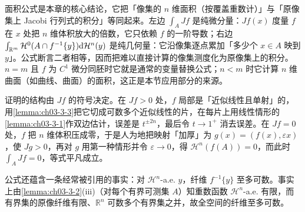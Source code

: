 \documentclass[../../main.tex]{subfiles}%
\begin{document}
\begin{remark}\label{remark:ch03-thm-3-8-动机}
面积公式是本章的核心结论，它把「像集的 $n$ 维面积（按覆盖重数计）」与「原像集上 Jacobi 行列式的积分」等同起来。左边 $\int_AJf$ 是纯微分量：$Jf(x)$ 度量 $f$ 在 $x$ 处把 $n$ 维体积放大的倍数，它只依赖 $f$ 的一阶导数；右边 $\int_{\mathbb{R}^m}\mathcal{H}^0(A\cap f^{-1}\{y\})\mathrm{d}\mathcal{H}^n(y)$ 是纯几何量：它沿像集逐点累加「多少个 $x\in A$ 映到 $y$」。公式断言二者相等，因而把难以直接计算的像集测度化为原像集上的积分。$n=m$ 且 $f$ 为 $C^1$ 微分同胚时它就是通常的变量替换公式；$n<m$ 时它计算 $n$ 维曲面（如曲线、曲面）的面积，这正是本节应用部分的来源。

证明的结构由 $Jf$ 的符号决定。在 $Jf>0$ 处，$f$ 局部是「近似线性且单射」的，用\cref{lemma:ch03-3-3}把它切成可数多个近似线性的片，在每片上用线性情形的\cref{lemma:ch03-3-1}作双边估计，误差是 $t^{\pm2n}$，最后令 $t\to1^+$ 消去误差。在 $Jf=0$ 处，$f$ 把 $n$ 维体积压成零，于是人为地把映射「加厚」为 $g(x)=(f(x),\varepsilon x)$，使 $Jg>0$，再对 $g$ 用第一种情形并令 $\varepsilon\to0$，得 $\mathcal{H}^n(f(A))=0$，而此时 $\int_AJf=0$，等式平凡成立。%

公式还蕴含一条经常被引用的事实：对 $\mathcal{H}^n$-a.e. $y$，纤维 $f^{-1}\{y\}$ 至多可数。事实上由\cref{lemma:ch03-3-2}(iii)（对每个有界可测集 $A$）知重数函数 $\mathcal{H}^n$-a.e. 有限，而有界集的原像纤维有限、$\mathbb{R}^n$ 可数多个有界集之并，故全空间的纤维至多可数。%
\end{remark}
\end{document}
